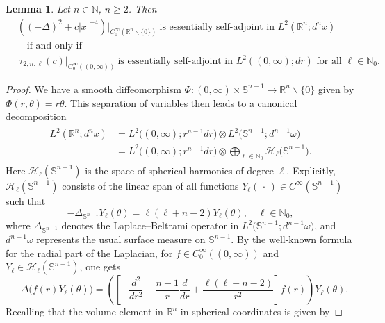 \documentclass[reqno,11pt,centertags]{amsart}
\newcommand{\bbN}{{\mathbb{N}}}
\newcommand{\bbR}{{\mathbb{R}}}
\newcommand{\bbS}{{\mathbb{S}}}
\newcommand{\<}{\langle}
\renewcommand{\>}{\rangle}
\newcommand{\no}{\nonumber}
\newcommand{\lb}{\label}
\newcommand{\dott}{\,\cdot\,}
\numberwithin{equation}{section}
\newtheorem{lemma}[theorem]{Lemma}
\theoremstyle{definition}
\begin{document}
\begin{lemma} \lb{l3.1}
Let $n \in \bbN$, $n\geq 2$. Then 
\begin{align}
& \left((-\Delta)^2 +c|x|^{-4}\right)\big|_{C_0^{\infty}(\bbR^n \backslash \{0\})}\ \mbox{is essentially self-adjoint  in $L^2(\bbR^n; d^n x)$}     \no \\
& \quad \text{if and only if}     \\
& \, \tau_{2,n,\ell}(c)\big|_{C_0^{\infty}((0,\infty))} \   \mbox{is essentially self-adjoint in $L^2((0,\infty); dr)$ for all $\ell\in \bbN_0$.}    \no
\end{align}
\end{lemma}
\begin{proof}  We have a smooth diffeomorphism $\Phi:(0,\infty)\times \mathbb{S}^{n-1}\rightarrow \bbR^n \backslash \{0\}$
given by $\Phi(r ,\theta)=r\theta$. This  separation of variables  then leads to a canonical  decomposition
\begin{align}
\begin{split} 
L^2(\bbR^n;d^nx) &= L^2\big((0,\infty); r^{n-1}dr\big) \otimes L^2\big(\bbS^{n-1};d^{n-1} \omega\big)   \\
&= L^2\big((0,\infty); r^{n-1}dr\big) \otimes {\bigoplus}_{\ell \in \bbN_0} \mathcal{H}_\ell\big(\mathbb{S}^{n-1}\big).
\end{split} 
\end{align}
Here $\mathcal{H}_\ell(\mathbb{S}^{n-1})$ is the space of spherical harmonics of degree $\ell$.
Explicitly, $\mathcal{H}_\ell(\mathbb{S}^{n-1})$ consists of the linear span of all functions $Y_\ell(\dott)\in C^\infty(\mathbb{S}^{n-1})$
such that 
\begin{equation}
-\Delta_{\mathbb{S}^{n-1}}Y_\ell(\theta) = \ell(\ell+n-2)Y_\ell(\theta), \quad \ell \in \bbN_0, 
\end{equation} 
where $\Delta_{\mathbb{S}^{n-1}}$ denotes the Laplace--Beltrami operator in $L^2\big(\mathbb{S}^{n-1}; d^{n-1}\omega\big)$, and $d^{n-1}\omega$ represents  the usual  surface measure on $\mathbb{S}^{n-1}$.
By the well-known formula for the radial part of the Laplacian, for $f \in C_0^{\infty}((0,\infty))$ 
and $Y_\ell \in \mathcal{H}_\ell(\mathbb{S}^{n-1})$, one gets 
\begin{equation}
- \Delta\bigg(f(r)Y_\ell(\theta)\bigg)=  
\left( \left[- \frac{d^2}{dr^2} - \frac{n-1}{r}\frac{d}{dr} + \frac{\ell (\ell +n - 2)}{r^2}\right] f(r)\right)Y_\ell(\theta).
\end{equation}
Recalling that the volume element in $\bbR^n$ in spherical coordinates is given by 

\end{proof}
\end{document}
